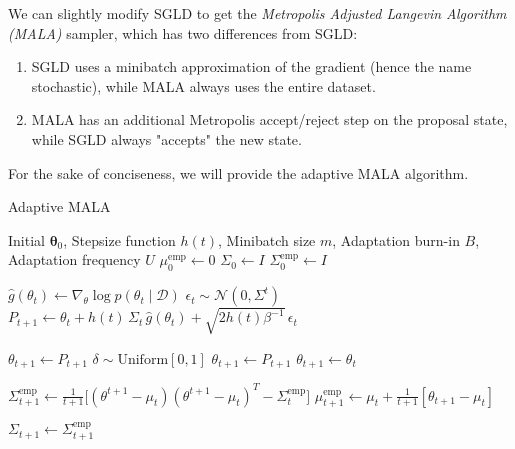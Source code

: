 \documentclass{article}
\begin{document}
    We can slightly modify SGLD to get the \textit{Metropolis Adjusted Langevin Algorithm (MALA)} sampler, which has two differences from SGLD: 
    \begin{enumerate}
      \item SGLD uses a minibatch approximation of the gradient (hence the name stochastic), while MALA always uses the entire dataset.
      \item MALA has an additional Metropolis accept/reject step on the proposal state, while SGLD always "accepts" the new state.
    \end{enumerate}
    For the sake of conciseness, we will provide the adaptive MALA algorithm. 

    \begin{algorithm}
      \caption{Adaptive MALA}\label{alg:adaptive_mala}
      \begin{algorithmic}

      \Require Initial $\boldsymbol{\theta}_0$, Stepsize function $h(t)$, Minibatch size $m$, Adaptation burn-in $B$, Adaptation frequency $U$
      \State $\mu_0^{\mathrm{emp}} \gets 0$
      \State $\Sigma_0 \gets I$
      \State $\Sigma_0^{\mathrm{emp}} \gets I$

          \State $\hat{g}(\theta_t) \gets \nabla_\theta \log{p(\theta_t \mid \mathcal{D})}$
          \State $\epsilon_t \sim \mathcal{N}(0, \Sigma^t)$
          \State $P_{t+1} \gets \theta_t + h(t) \, \Sigma_t \, \hat{g}(\theta_t) + \sqrt{2 h(t) \beta^{-1}} \, \epsilon_t$ 
          
              \State $\theta_{t+1} \gets P_{t+1}$
          \Else 
              \State $\delta \sim \mathrm{Uniform}[0, 1]$ 
                  \State $\theta_{t+1} \gets P_{t+1}$ 
              \Else 
                  \State $\theta_{t+1} \gets \theta_t$
              \EndIf
          \EndIf
          
          \State $\Sigma^\mathrm{emp}_{t+1} \gets \frac{1}{t+1} \big[(\theta^{t+1} - \mu_t) (\theta^{t+1} - \mu_t)^T - \Sigma^\mathrm{emp}_t \big]$
          \State $\mu_{t+1}^\mathrm{emp} \gets \mu_t + \frac{1}{t+1} [ \theta_{t+1} - \mu_t ]$
          
              \State $\Sigma_{t+1} \gets \Sigma_{t+1}^{\mathrm{emp}}$
          \EndIf
      \EndFor

      \end{algorithmic}
    \end{algorithm}
\end{document}
